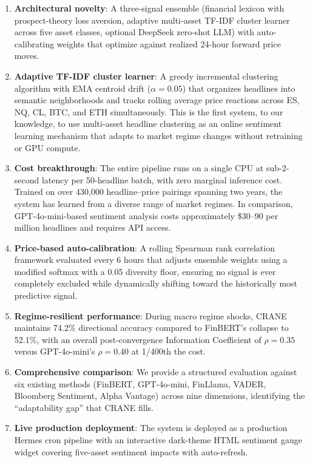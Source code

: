 \begin{enumerate}
    \item \textbf{Architectural novelty}: A three-signal ensemble (financial lexicon with prospect-theory loss aversion, adaptive multi-asset TF-IDF cluster learner across five asset classes, optional DeepSeek zero-shot LLM) with auto-calibrating weights that optimize against realized 24-hour forward price moves.

    \item \textbf{Adaptive TF-IDF cluster learner}: A greedy incremental clustering algorithm with EMA centroid drift ($\alpha = 0.05$) that organizes headlines into semantic neighborhoods and tracks rolling average price reactions across ES, NQ, CL, BTC, and ETH simultaneously. This is the first system, to our knowledge, to use multi-asset headline clustering as an online sentiment learning mechanism that adapts to market regime changes without retraining or GPU compute.

    \item \textbf{Cost breakthrough}: The entire pipeline runs on a single CPU at sub-2-second latency per 50-headline batch, with zero marginal inference cost. Trained on over 430,000 headline--price pairings spanning two years, the system has learned from a diverse range of market regimes. In comparison, GPT-4o-mini-based sentiment analysis costs approximately \$30--90 per million headlines and requires API access.

    \item \textbf{Price-based auto-calibration}: A rolling Spearman rank correlation framework evaluated every 6 hours that adjusts ensemble weights using a modified softmax with a 0.05 diversity floor, ensuring no signal is ever completely excluded while dynamically shifting toward the historically most predictive signal.

    \item \textbf{Regime-resilient performance}: During macro regime shocks, CRANE maintains 74.2\% directional accuracy compared to FinBERT's collapse to 52.1\%, with an overall post-convergence Information Coefficient of $\rho = 0.35$ versus GPT-4o-mini's $\rho = 0.40$ at 1/400th the cost.

    \item \textbf{Comprehensive comparison}: We provide a structured evaluation against six existing methods (FinBERT, GPT-4o-mini, FinLlama, VADER, Bloomberg Sentiment, Alpha Vantage) across nine dimensions, identifying the ``adaptability gap'' that CRANE fills.

    \item \textbf{Live production deployment}: The system is deployed as a production Hermes cron pipeline with an interactive dark-theme HTML sentiment gauge widget covering five-asset sentiment impacts with auto-refresh.
\end{enumerate}

